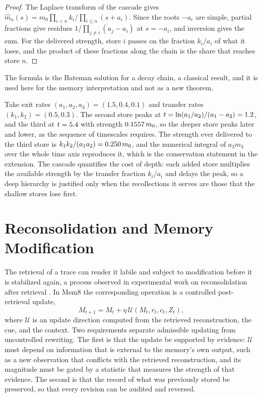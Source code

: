 \begin{proof}
The Laplace transform of the cascade gives $\hat m_n(s)=m_0\prod_{i<n}k_i\big/\prod_{i\le n}(s+a_i)$. Since the roots $-a_i$ are simple, partial fractions give residues $1/\prod_{j\ne i}(a_j-a_i)$ at $s=-a_i$, and inversion gives the sum. For the delivered strength, store $i$ passes on the fraction $k_i/a_i$ of what it loses, and the product of these fractions along the chain is the share that reaches store $n$.
\end{proof}

The formula is the Bateman solution for a decay chain, a classical result, and it is used here for the memory interpretation and not as a new theorem.

\begin{workedex}\label{ex:cascade27}
Take exit rates $(a_1,a_2,a_3)=(1.5,0.4,0.1)$ and transfer rates $(k_1,k_2)=(0.5,0.3)$. The second store peaks at $t=\ln(a_1/a_2)/(a_1-a_2)=1.2$, and the third at $t=5.4$ with strength $0.1557\,m_0$, so the deeper store peaks later and lower, as the sequence of timescales requires. The strength ever delivered to the third store is $k_1k_2/(a_1a_2)=0.250\,m_0$, and the numerical integral of $a_3m_3$ over the whole time axis reproduces it, which is the conservation statement in the extension. The cascade quantifies the cost of depth: each added store multiplies the available strength by the transfer fraction $k_i/a_i$ and delays the peak, so a deep hierarchy is justified only when the recollections it serves are those that the shallow stores lose first.
\end{workedex}


\chapter{Reconsolidation and Memory Modification}\label{ch:reconsol}

The retrieval of a trace can render it labile and subject to modification before it is stabilized again, a process observed in experimental work on reconsolidation after retrieval \cite{nader2000}. In Mem8 the corresponding operation is a controlled post-retrieval update,
\begin{equation}\label{eq:reconsol}
M_{t+1}=M_t+\eta\,\mathcal U(M_t,r_t,c_t,Z_t),
\end{equation}
where $\mathcal U$ is an update direction computed from the retrieved reconstruction, the cue, and the context. Two requirements separate admissible updating from uncontrolled rewriting. The first is that the update be supported by evidence: $\mathcal U$ must depend on information that is external to the memory's own output, such as a new observation that conflicts with the retrieved reconstruction, and its magnitude must be gated by a statistic that measures the strength of that evidence. The second is that the record of what was previously stored be preserved, so that every revision can be audited and reversed.

